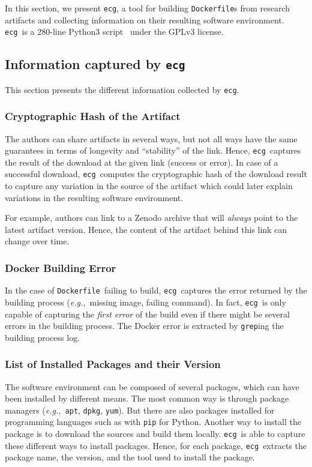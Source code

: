 \documentclass[sigconf,natbib=false]{acmart}
\newcommand{\eg}{\emph{e.g.,}}
\newcommand{\df}{\texttt{Dockerfile}}
\newcommand{\ecg}{\texttt{ecg}}
\newcommand{\fmc}[1]{{}} %
\begin{document}
In this section, we present \ecg, \fmc{Can we explain the acronym?} a tool for building \df s from research artifacts and collecting information on their resulting software environment.
\ecg\ is a 280-line Python3 script~\cite{ecg} under the GPLv3 license.

\subsection{Information captured by \ecg}\label{sec:ecg:capture}

This section presents the different information collected by \ecg.%

\subsubsection{Cryptographic Hash of the Artifact}

The authors can share artifacts in several ways, but not all ways have the same guarantees in terms of longevity and ``stability'' of the link.
Hence, \ecg\ captures the result of the download at the given link (success or error).
In case of a successful download, \ecg\ computes the cryptographic hash of the download result to capture any variation in the source of the artifact which could later explain variations in the resulting software environment.

For example, authors can link to a Zenodo archive that will \emph{always} point to the latest artifact version.
Hence, the content of the artifact behind this link can change over time.

\subsubsection{Docker Building Error}

In the case of \df\ failing to build, \ecg\ captures the error returned by the building process (\eg\ missing image, failing command).
In fact, \ecg\ is only capable of capturing the \emph{first error} of the build even if there might be several errors in the building process.
The Docker error is extracted by \texttt{grep}ing the building process log.

\subsubsection{List of Installed Packages and their Version}

The software environment can be composed of several packages, which can have been installed by different means.
The most common way is through package managers (\eg\ \texttt{apt}, \texttt{dpkg}, \texttt{yum}).
But there are also packages installed for programming languages such as with \texttt{pip} for Python.
Another way to install the package is to download the sources and build them locally.
\ecg\ is able to capture these different ways to install packages.
Hence, for each package, \ecg\ extracts the package name, the version, and the tool used to install the package.
\end{document}
